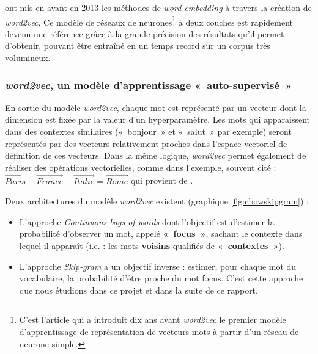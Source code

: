 \documentclass[11pt,french,french]{article}
\let\rmarkdownfootnote\footnote%
\def\footnote{\protect\rmarkdownfootnote}
\begin{document}
\cite{Mikolov} ont mis en avant en 2013 les méthodes de \emph{word-embedding} à travers la création de \emph{word2vec}. Ce modèle de réseaux de neurones\footnote{C'est l'article \cite{Bengio} qui a introduit dix ans avant \emph{word2vec} le premier modèle d'apprentissage de représentation de vecteurs-mots à partir d'un réseau de neurone simple.} à deux couches est rapidement devenu une référence grâce à la grande précision des résultats qu'il permet d'obtenir, pouvant être entraîné en un temps record sur un corpus très volumineux.

\hypertarget{subsec:word2vec}{%
\subsubsection{\texorpdfstring{\emph{word2vec}, un modèle d'apprentissage «~auto-supervisé~»}{word2vec, un modèle d'apprentissage «~auto-supervisé~»}}\label{subsec:word2vec}}

En sortie du modèle \emph{word2vec}, chaque mot est représenté par un vecteur dont la dimension est fixée par la valeur d'un hyperparamètre. Les mots qui apparaissent dans des contextes similaires («~bonjour~» et «~salut~» par exemple) seront représentés par des vecteurs relativement proches dans l'espace vectoriel de définition de ces vecteurs. Dans la même logique, \emph{word2vec} permet également de réaliser des opérations vectorielles, comme dans l'exemple, souvent cité : \(\overrightarrow{Paris} - \overrightarrow{France} + \overrightarrow{Italie} = \overrightarrow{Rome}\) qui provient de \cite{Mikolov}.

Deux architectures du modèle \emph{word2vec} existent (graphique \ref{fig:cbowskipgram}) :

\begin{itemize}
\item
  L'approche \emph{Continuous bags of words} dont l'objectif est d'estimer la probabilité d'observer un mot, appelé \textbf{«~focus~»}, sachant le contexte dans lequel il apparaît (i.e. : les mots \textbf{voisins} qualifiés de \textbf{«~contextes~»}).
\item
  L'approche \emph{Skip-gram} a un objectif inverse : estimer, pour chaque mot du vocabulaire, la probabilité d'être proche du mot focus.
  C'est cette approche que nous étudions dans ce projet et dans la suite de ce rapport.
\end{itemize}
\end{document}
